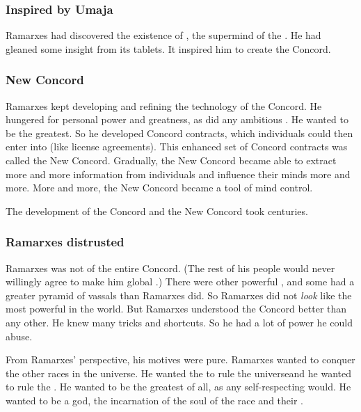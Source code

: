 \subsubsection{Inspired by Umaja}
Ramarxes had discovered the existence of , the supermind of the . 
He had gleaned some insight from its tablets. 
It inspired him to create the Concord. 





\subsubsection{New Concord}
Ramarxes kept developing and refining the technology of the Concord. 
He hungered for personal power and greatness, as did any ambitious \caisith. 
He wanted to be the greatest. 
So he developed  Concord contracts, which individuals could then enter into (like license agreements). 
This enhanced set of Concord contracts was called the New Concord. 
Gradually, the New Concord became able to extract more and more information from individuals and influence their minds more and more.
More and more, the New Concord became a tool of mind control. 

The development of the Concord and the New Concord took centuries. 





\subsubsection{Ramarxes distrusted}
Ramarxes was not \apex of the entire Concord. 
(The rest of his people would never willingly agree to make him global \apex.)
There were other powerful \apexes, and some had a greater pyramid of vassals than Ramarxes did. 
So Ramarxes did not \emph{look} like the most powerful \caisith in the world.
But Ramarxes understood the Concord better than any other.
He knew many tricks and shortcuts.
So he had a lot of power he could abuse. 

From Ramarxes' perspective, his motives were pure. 
Ramarxes wanted to conquer the other races in the universe. 
He wanted the \caisith to rule the universe\dash and he wanted to rule the \caisith.
He wanted to be the greatest of all, as any self-respecting \caisith would. 
He wanted to be a god, the incarnation of the soul of the \caisith race and their . 

